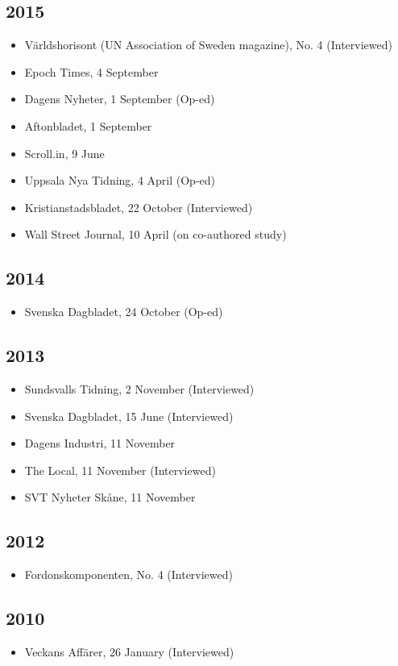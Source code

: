 \documentclass[11pt,a4paper]{article}
\newcommand{\cventry}[1]{\item #1}
\begin{document}
\subsection{2015}
\begin{itemize}
  \cventry{Världshorisont (UN Association of Sweden magazine), No. 4 (Interviewed)}
  \cventry{Epoch Times, 4 September}
  \cventry{Dagens Nyheter, 1 September (Op-ed)}
  \cventry{Aftonbladet, 1 September}
  \cventry{Scroll.in, 9 June}
  \cventry{Uppsala Nya Tidning, 4 April (Op-ed)}
  \cventry{Kristianstadsbladet, 22 October (Interviewed)}
  \cventry{Wall Street Journal, 10 April (on co-authored study)}
\end{itemize}

\subsection{2014}
\begin{itemize}
  \cventry{Svenska Dagbladet, 24 October (Op-ed)}
\end{itemize}

\subsection{2013}
\begin{itemize}
  \cventry{Sundsvalls Tidning, 2 November (Interviewed)}
  \cventry{Svenska Dagbladet, 15 June (Interviewed)}
  \cventry{Dagens Industri, 11 November}
  \cventry{The Local, 11 November (Interviewed)}
  \cventry{SVT Nyheter Skåne, 11 November}
\end{itemize}

\subsection{2012}
\begin{itemize}
  \cventry{Fordonskomponenten, No. 4 (Interviewed)}
\end{itemize}

\subsection{2010}
\begin{itemize}
  \cventry{Veckans Affärer, 26 January (Interviewed)}
\end{itemize}

\end{document}
